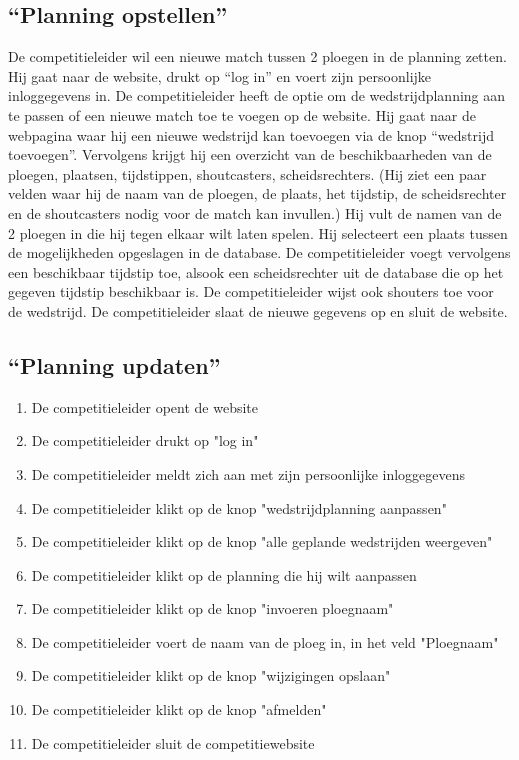 \documentclass[12pt,a4paper]{article}
\begin{document}
			\subsection{``Planning opstellen''}
			De competitieleider wil een nieuwe match tussen 2 ploegen in de planning zetten. Hij gaat naar de website, drukt op “log in” en voert zijn persoonlijke inloggegevens in. De competitieleider heeft de optie om de wedstrijdplanning aan te passen of een nieuwe match toe te voegen op de website. Hij gaat naar de webpagina waar hij een nieuwe wedstrijd kan toevoegen via de knop “wedstrijd toevoegen”. Vervolgens krijgt hij een overzicht van de beschikbaarheden van de ploegen, plaatsen, tijdstippen, shoutcasters, scheidsrechters. (Hij ziet een paar velden waar hij de naam van de ploegen, de plaats, het tijdstip, de scheidsrechter en de shoutcasters nodig voor de match kan invullen.) Hij vult de namen van de 2 ploegen in die hij tegen elkaar wilt laten spelen. Hij selecteert een plaats tussen de mogelijkheden opgeslagen in de database. De competitieleider voegt vervolgens een beschikbaar tijdstip toe, alsook een scheidsrechter uit de database die op het gegeven tijdstip beschikbaar is. De competitieleider wijst ook shouters toe voor de wedstrijd. De competitieleider slaat de nieuwe gegevens op en sluit de website.
			\newpage
			\subsection{``Planning updaten''}
			\begin{enumerate}
				\item De competitieleider opent de website
				\item De competitieleider drukt op "log in"
				\item De competitieleider meldt zich aan met zijn persoonlijke inloggegevens
				\item De competitieleider klikt op de knop "wedstrijdplanning aanpassen"
				\item De competitieleider klikt op de knop "alle geplande wedstrijden weergeven"
				\item De competitieleider klikt op de planning die hij wilt aanpassen
				\item De competitieleider klikt op de knop "invoeren ploegnaam"
				\item De competitieleider voert de naam van de ploeg in, in het veld "Ploegnaam"
				\item De competitieleider klikt op de knop "wijzigingen opslaan"
				\item De competitieleider klikt op de knop "afmelden"
				\item De competitieleider sluit de competitiewebsite
			\end{enumerate}
\end{document}
